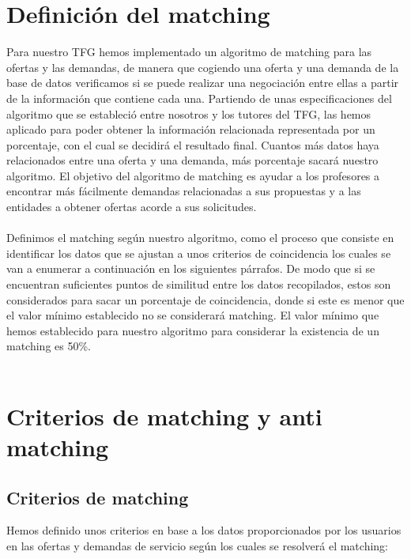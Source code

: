 \documentclass[11pt]{book}
\begin{document}

\section{Definición del matching }

Para nuestro TFG hemos implementado un algoritmo de matching para las ofertas y las demandas, de manera que cogiendo una oferta y una demanda de la base de datos verificamos si se puede realizar una negociación entre ellas a partir de la información que contiene cada una. Partiendo de unas especificaciones del algoritmo que se estableció entre nosotros y los tutores del TFG, las hemos aplicado para poder obtener la información relacionada representada por un porcentaje, con el cual  se decidirá el resultado final.  Cuantos más datos haya relacionados entre una oferta y una demanda, más porcentaje sacará nuestro algoritmo. El objetivo del algoritmo de matching es ayudar a los profesores a encontrar más fácilmente demandas relacionadas a sus propuestas y a las entidades a obtener ofertas acorde a sus solicitudes. \\\\

Definimos el matching según nuestro algoritmo, como el proceso que consiste en identificar los datos que se ajustan a unos criterios de coincidencia los cuales se van a enumerar a continuación en los siguientes párrafos. De modo que si se encuentran suficientes puntos de similitud entre los datos recopilados, estos son considerados para sacar un porcentaje de coincidencia, donde si este es menor que el valor mínimo establecido no se considerará matching. El valor mínimo que hemos establecido para nuestro algoritmo para considerar la existencia de un matching es 50\%.
\\\\

\section{Criterios de matching y anti matching}
\subsection{Criterios de matching }

Hemos definido unos criterios en base a los datos proporcionados por los usuarios en las ofertas y demandas de servicio según los cuales se resolverá el matching:
\end{document}
